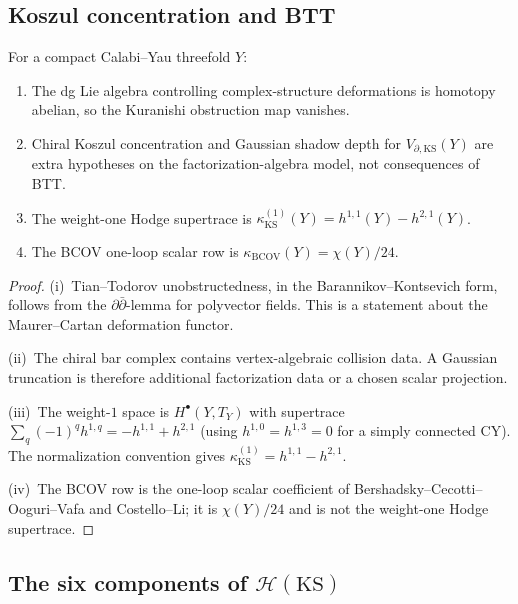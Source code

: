 \subsection{Koszul concentration and BTT}

\begin{theorem}
\label{thm:thqg-ks-koszul-btt}
For a compact Calabi--Yau threefold $Y$:
\begin{enumerate}[label=\textup{(\roman*)}]
\item The dg Lie algebra controlling complex-structure deformations is
 homotopy abelian, so the Kuranishi obstruction map vanishes.
\item Chiral Koszul concentration and Gaussian shadow depth for
 $V_{\partial,\mathrm{KS}}(Y)$ are extra hypotheses on the
 factorization-algebra model, not consequences of BTT.
\item The weight-one Hodge supertrace is
 $\kappa_{\mathrm{KS}}^{(1)}(Y)=h^{1,1}(Y)-h^{2,1}(Y)$.
\item The BCOV one-loop scalar row is
 $\kappa_{\mathrm{BCOV}}(Y)=\chi(Y)/24$.
\end{enumerate}
\end{theorem}

\begin{proof}
(i)~Tian--Todorov unobstructedness, in the
Barannikov--Kontsevich form, follows from the
$\partial\bar\partial$-lemma for polyvector fields. This is a
statement about the Maurer--Cartan deformation functor.

(ii)~The chiral bar complex contains vertex-algebraic collision data.
A Gaussian truncation is therefore additional factorization data or a
chosen scalar projection.

(iii)~The weight-$1$ space is $H^\bullet(Y, T_Y)$ with supertrace
$\sum_q (-1)^q h^{1,q} = -h^{1,1} + h^{2,1}$ (using $h^{1,0} =
h^{1,3} = 0$ for a simply connected CY). The normalization
convention gives $\kappa_{\mathrm{KS}}^{(1)} = h^{1,1}-h^{2,1}$.

(iv)~The BCOV row is the one-loop scalar coefficient of
Bershadsky--Cecotti--Ooguri--Vafa and Costello--Li; it is
$\chi(Y)/24$ and is not the weight-one Hodge supertrace.
\end{proof}


\subsection{The six components of $\mathcal{H}(\mathrm{KS})$}

